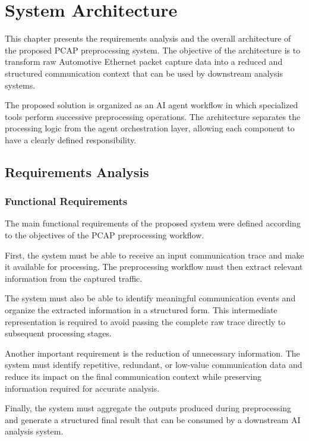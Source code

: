 \chapter{System Architecture}

This chapter presents the requirements analysis and the overall architecture of the proposed PCAP preprocessing system. The objective of the architecture is to transform raw Automotive Ethernet packet capture data into a reduced and structured communication context that can be used by downstream analysis systems.

The proposed solution is organized as an AI agent workflow in which specialized tools perform successive preprocessing operations. The architecture separates the processing logic from the agent orchestration layer, allowing each component to have a clearly defined responsibility.

\section{Requirements Analysis}

\subsection{Functional Requirements}

The main functional requirements of the proposed system were defined according to the objectives of the PCAP preprocessing workflow.

First, the system must be able to receive an input communication trace and make it available for processing. The preprocessing workflow must then extract relevant information from the captured traffic.

The system must also be able to identify meaningful communication events and organize the extracted information in a structured form. This intermediate representation is required to avoid passing the complete raw trace directly to subsequent processing stages.

Another important requirement is the reduction of unnecessary information. The system must identify repetitive, redundant, or low-value communication data and reduce its impact on the final communication context while preserving information required for accurate analysis.

Finally, the system must aggregate the outputs produced during preprocessing and generate a structured final result that can be consumed by a downstream AI analysis system.

